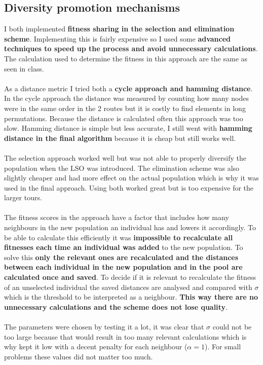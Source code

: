 \documentclass[a4paper,10pt]{article}
\begin{document}
\subsection{Diversity promotion mechanisms}
\label{dpm}
I both implemented \textbf{fitness sharing in the selection and elimination scheme}. Implementing this is fairly expensive so I used some \textbf{advanced techniques to speed up the process and avoid unnecessary calculations}. The calculation used to determine the fitness in this approach are the same as seen in class.
\\\\
As a distance metric I tried both a \textbf{cycle approach and hamming distance}. In the cycle approach the distance was measured by counting how many nodes were in the same order in the 2 routes but it is costly to find elements in long permutations. Because the distance is calculated often this approach was too slow. Hamming distance is simple but less accurate, I still went with \textbf{hamming distance in the final algorithm} because it is cheap but still works well.
\\\\
The selection approach worked well but was not able to properly diversify the population when the LSO was introduced. The elimination scheme was also slightly cheaper and had more effect on the actual population which is why it was used in the final approach. Using both worked great but is too expensive for the larger tours.
\\\\
The fitness scores in the approach have a factor that includes how many neighbours in the new population an individual has and lowers it accordingly. To be able to calculate this efficiently it was \textbf{impossible to recalculate all fitnesses each time an individual was added} to the new population. To solve this \textbf{only the relevant ones are recalculated and the distances between each individual in the new population and in the pool are calculated once and saved}. To decide if it is relevant to recalculate the fitness of an unselected individual the saved distances are analysed and compared with $\sigma$ which is the threshold to be interpreted as a neighbour. \textbf{This way there are no unnecessary calculations and the scheme does not lose quality}.
\\\\
The parameters were chosen by testing it a lot, it was clear that $\sigma$ could not be too large because that would result in too many relevant calculations which is why  kept it low with a decent penalty for each neighbour ($\alpha = 1$). For small problems these values did not matter too much.
\end{document}
